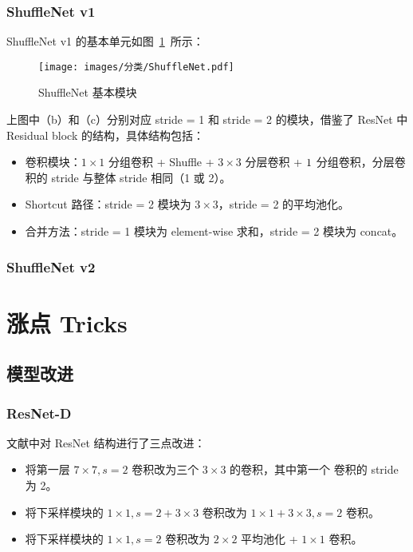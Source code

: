 \subsection{ShuffleNet v1}
ShuffleNet v1 的基本单元如图~\ref{fig:shufflenet}~所示：

\begin{figure}[ht]
  \centering
  \texttt{[image: images/分类/ShuffleNet.pdf]}
  \caption{ShuffleNet 基本模块}
  \label{fig:shufflenet}
\end{figure}

上图中（b）和（c）分别对应 stride = 1 和 stride = 2 的模块，借鉴了 ResNet 中
Residual block 的结构，具体结构包括：

\begin{itemize}
  \item 卷积模块：$1 \times 1$ 分组卷积 + Shuffle + $3 \times 3$ 分层卷积 + $1
    \time 1$ 分组卷积，分层卷积的 stride 与整体 stride 相同（1 或 2）。
  \item Shortcut 路径：stride = 2 模块为 $3 \times 3$，stride = 2 的平均池化。
  \item 合并方法：stride = 1 模块为 element-wise 求和，stride = 2 模块为 concat。
\end{itemize}

\subsection{ShuffleNet v2}

\chapter{涨点 Tricks}
\section{模型改进}
\subsection{ResNet-D}
文献中对 ResNet 结构进行了三点改进：
\begin{itemize}
  \item 将第一层 $7 \times 7, s=2$ 卷积改为三个 $3 \times 3$ 的卷积，其中第一个
    卷积的 stride 为 2。
  \item 将下采样模块的 $1 \times 1, s=2 + 3 \times 3$ 卷积改为 $1 \times 1 + 3
    \times 3, s=2$ 卷积。
  \item 将下采样模块的 $1 \times 1, s=2$ 卷积改为 $2 \times 2$ 平均池化 + $1
    \times 1$ 卷积。
\end{itemize}

